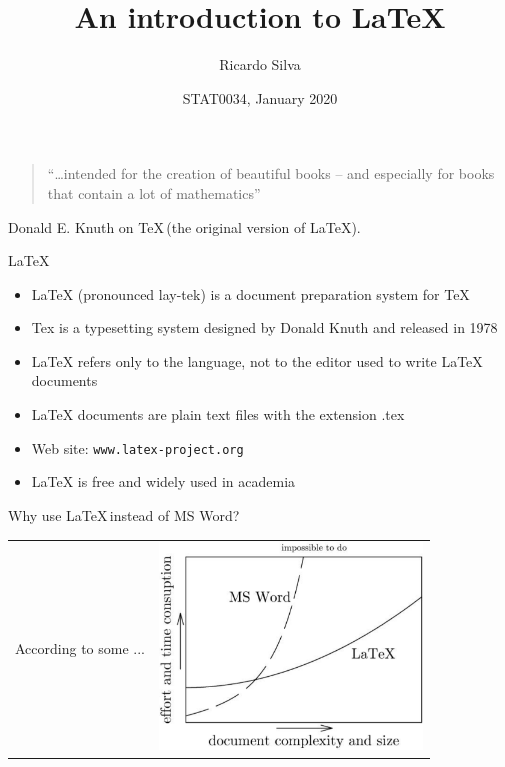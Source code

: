 \documentclass{beamer}             %
\title{\bf \Large An introduction to \LaTeX}
\author[]{Ricardo Silva}
\date{STAT0034, January 2020}
\begin{document}
\begin{frame}
\titlepage

\begin{quote}
 ``\ldots intended for the creation of beautiful books -- and especially for books that  contain a lot of mathematics'' 
\end{quote}
\begin{center}Donald E. Knuth on \TeX \,(the original version of \LaTeX). \end{center}

\end{frame}

\begin{frame}{\LaTeX}

\begin{itemize}
\setlength{\itemsep}{.3cm}
\item LaTeX (pronounced lay-tek) is a document preparation system for TeX
\item Tex is a typesetting system designed by Donald Knuth and released in 1978
\item LaTeX refers only to the language, not to the editor used to write LaTeX documents
\item LaTeX documents are plain text files with the extension .tex
\item Web site: {\tt www.latex-project.org}
\item LaTeX is free and widely used in academia
\end{itemize}
\end{frame}


\begin{frame}{Why use \LaTeX \,instead of MS Word?}

\begin{tabular}{cc}
\begin{minipage}{1.5in}
{According to some ...}
\end{minipage}
&
\begin{minipage}{3in}
\includegraphics[width=2.75in]{latex_vs_word.pdf}
\end{minipage}
\end{tabular}
\end{frame}
\end{document}
